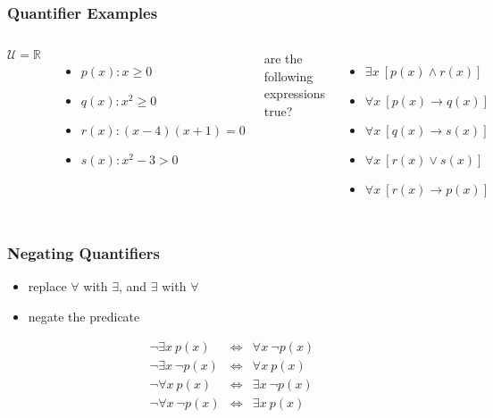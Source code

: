 \documentclass[dvipsnames]{beamer}
\begin{document}
\begin{frame}
  \frametitle{Quantifier Examples}

  \begin{columns}[t]
    $\mathcal{U} = \mathbb{R}$\\

    \begin{itemize}
      \item $p(x): x \geq 0$
      \item $q(x): x^2 \geq 0$
      \item $r(x): (x-4) (x+1) = 0$
      \item $s(x): x^2 -3 > 0$
    \end{itemize}

    are the following expressions true?

    \begin{itemize}
      \pause
      \item $\exists x~[p(x) \wedge r(x)]$

      \pause
      \item $\forall x~[p(x) \rightarrow q(x)]$

      \pause
      \item $\forall x~[q(x) \rightarrow s(x)]$

      \pause
      \item $\forall x~[r(x) \vee s(x)]$

      \pause
      \item $\forall x~[r(x) \rightarrow p(x)]$
    \end{itemize}
  \end{columns}
\end{frame}

\begin{frame}
  \frametitle{Negating Quantifiers}

  \begin{itemize}
    \item replace $\forall$ with $\exists$, and $\exists$ with $\forall$
    \item negate the predicate
  \end{itemize}

  \pause
  \begin{eqnarray*}
    \neg \exists x~p(x)      & \Leftrightarrow & \forall x~\neg p(x)\\
    \neg \exists x~\neg p(x) & \Leftrightarrow & \forall x~p(x)\\
    \neg \forall x~p(x)      & \Leftrightarrow & \exists x~\neg p(x)\\
    \neg \forall x~\neg p(x) & \Leftrightarrow & \exists x~p(x)
  \end{eqnarray*}
\end{frame}
\end{document}
